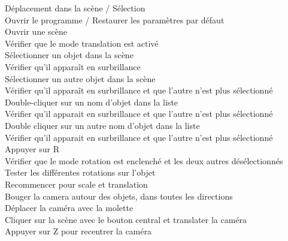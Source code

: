 Déplacement dans la scène / Sélection\\
		Ouvrir le programme / Restaurer les paramètres par défaut\\
		Ouvrir une scène \\
		Vérifier que le mode translation est activé\\
		Sélectionner un objet dans la scène\\
		Vérifier qu'il apparaît en surbrillance\\
		Sélectionner un autre objet dans la scène\\
		Vérifier qu'il apparaît en surbrillance et que l'autre n'est plus sélectionné\\
		Double-cliquer sur un nom d'objet dans la liste\\
		Vérifier qu'il apparait en surbrillance et que l'autre n'est plus sélectionné\\
		Double cliquer sur un autre nom d'objet dans la liste\\
		Vérifier qu'il apparait en surbrillance et que l'autre n'est plus sélectionné\\
		Appuyer sur R\\
		Vérifier que le mode rotation est enclenché et les deux autres désélectionnés\\
		Tester les différentes rotations sur l'objet\\
		Recommencer pour scale et translation\\
		Bouger la camera autour des objets, dans toutes les directions\\
		Déplacer la caméra avec la molette\\
		Cliquer sur la scène avec le bouton central et translater la caméra \\
                Appuyer sur Z pour recentrer la caméra\\
\\
		
